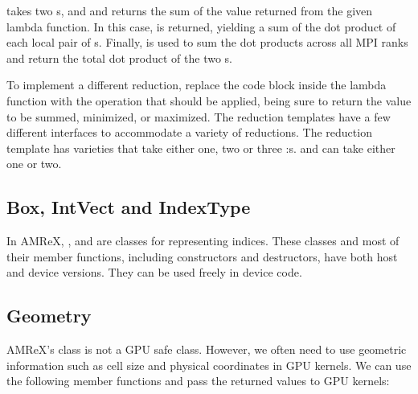 \documentclass[letterpaper,10pt,english]{sphinxmanual}
\begin{document}
\sphinxAtStartPar
{} takes two s,  and  and
returns the sum of the value returned from the given lambda function.
In this case,  is returned, yielding a sum of the
dot product of each local pair of s. Finally,
 is used to sum the dot products across all
MPI ranks and return the total dot product of the two
s.

\sphinxAtStartPar
To implement a different reduction, replace the code block inside the
lambda function with the operation that should be applied, being sure
to return the value to be summed, minimized, or maximized.  The reduction
templates have a few different interfaces to accommodate a variety of
reductions.  The  reduction template has varieties
that take either one, two or three :s.
 and  can take either one
or two.


\subsection{Box, IntVect and IndexType}
\label{\detokenize{GPU:box-intvect-and-indextype}}
\sphinxAtStartPar
In AMReX, ,  and 
are classes for representing indices.  These classes and most of
their member functions, including constructors and destructors,
have both host and device versions.  They can be used freely
in device code.


\subsection{Geometry}
\label{\detokenize{GPU:geometry}}
\sphinxAtStartPar
AMReX’s  class is not a GPU safe class.  However, we often need
to use geometric information such as cell size and physical coordinates
in GPU kernels.  We can use the following member functions and pass
the returned values to GPU kernels:
\end{document}
